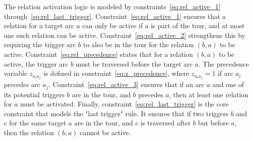 \documentclass[twocolumn]{article} %
\begin{document}
The relation activation logic is modeled by constraints~\eqref{eq:rel_active_1} through~\eqref{eq:rel_last_trigger}.
Constraint~\eqref{eq:rel_active_1} ensures that a relation for a target arc $a$ can only be active if $a$ is part of the tour, and at most one such relation can be active.
Constraint~\eqref{eq:rel_active_2} strengthens this by requiring the trigger arc $b$ to also be in the tour for the relation $(b,a)$ to be active.
Constraint~\eqref{eq:rel_precedence} states that for a relation $(b,a)$ to be active, the trigger arc $b$ must be traversed before the target arc $a$.
The precedence variable $z_{a_ia_j}$ is defined in constraint~\eqref{eq:z_precedence}, where $z_{a_ia_j}=1$ if arc $a_i$ precedes arc $a_j$.
Constraint~\eqref{eq:rel_active_3} ensures that if an arc $a$ and one of its potential triggers $b$ are in the tour, and $b$ precedes $a$, then at least one relation for $a$ must be activated.
Finally, constraint~\eqref{eq:rel_last_trigger} is the core constraint that models the "last trigger" rule. It ensures that if two triggers $b$ and $c$ for the same target $a$ are in the tour, and $c$ is traversed after $b$ but before $a$, then the relation $(b,a)$ cannot be active.

\normalsize

\end{document}
